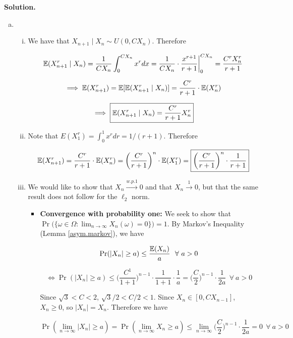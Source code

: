\begin{enumerate}[(1)]
\textbf{Solution.} \begin{enumerate}[(a)]

\item 

\begin{enumerate}[(i)]

\item We have that \(X_{n+1} \mid X_n \sim U(0, C X_n)\). Therefore

\[
\mathbb{E}(X_{n+1}^r \mid X_n) = \frac{1}{C X_n} \int_{0}^{CX_n} x^r dx = \frac{1}{CX_n} \cdot \frac{x^{r+1}}{r+1} \bigg|_0^{CX_n} = \frac{C^rX_n^r}{r+1}
\]

\[
\implies \mathbb{E}(X_{n+1}^r) = \mathbb{E}[\mathbb{E}(X_{n+1}^r \mid X_n)] = \frac{C^r}{r+1} \cdot \mathbb{E}( X_n^r)
\]

\[
\implies \boxed{ \mathbb{E}(X_{n+1}^r \mid X_n) = \frac{C^r}{r+1} X_n^r}
\]

\item Note that \(E(X_1^r) = \int_0^1 x^r dr = 1/(r+1)\). Therefore 

\[
\mathbb{E}(X_{n+1}^r) = \frac{C^r}{r+1} \cdot \mathbb{E}( X_n^r) = \bigg( \frac{C^r}{r+1}\bigg)^n \cdot \mathbb{E}(X_1^r) =  \boxed{\bigg( \frac{C^r}{r+1}\bigg)^n \cdot \frac{1}{r+1}}
\]

\item We would like to show that \(X_n \xrightarrow{w.p.1} 0\) and that \(X_n \xrightarrow{1} 0\), but that the same result does not follow for the \(\ell_2\) norm.

\begin{itemize}

\item \textbf{Convergence with probability one:} We seek to show that \(\Pr\big( \{\omega \in \Omega: \lim_{n \to \infty} X_n(\omega) = 0 \} \big) = 1\). By Markov's Inequality (Lemma \ref{asym.markov}), we have

\[
\Pr(|X_n| \geq a) \leq \frac{\mathbb{E}(X_n)}{a} \ \ \forall \ a > 0
\]

\[
\iff \Pr(|X_n| \geq a) \leq \bigg( \frac{C^1}{1+1}\bigg)^{n-1} \cdot \frac{1}{1+1} \cdot \frac{1}{a} =   \bigg( \frac{C}{2}\bigg)^{n-1} \cdot \frac{1}{2a}  \ \ \forall \ a > 0
\]

Since \(\sqrt{3} < C < 2\), \(\sqrt{3}/2 < C/2 < 1\). Since \(X_n \in [0, C X_{n-1}]\), \(X_n \geq 0\), so \(|X_n| = X_n\). Therefore we have

\[
\Pr(\lim_{n \to \infty} |X_n| \geq a) = \Pr(\lim_{n \to \infty} X_n \geq a) \leq \lim_{n \to \infty}  \bigg( \frac{C}{2}\bigg)^{n-1} \cdot \frac{1}{2a} =  0 \ \ \forall \ a > 0
\]


\end{itemize}
\end{enumerate}
\end{enumerate}
\end{enumerate}
